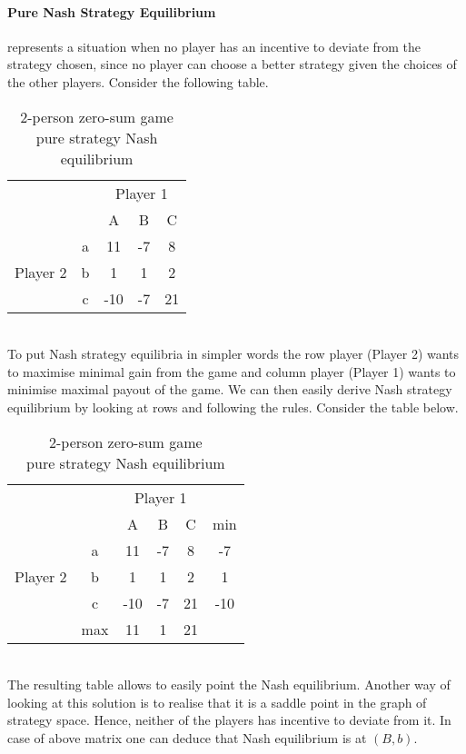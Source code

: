 \documentclass[10pt, a4paper]{report}
\begin{document}
\paragraph{Pure Nash Strategy Equilibrium} represents a situation when no player has an incentive to deviate from the strategy chosen, since no player can choose a better strategy given the choices of the other players. Consider the following table.
\begin{table}[ht!]
	\hspace{-4em}
	\centering
	\begin{tabular}{ccccc|}
		& & \multicolumn{3}{c}{Player 1}                                  \\ \cline{3-5}
		& & A & B & \multicolumn{1}{c}{C}                                 \\ \cline{3-5}
		\multirow{3}{*}{Player 2} & \multicolumn{1}{|c|}{a} & 11 & -7 & 8 \\
		& \multicolumn{1}{|c|}{b} & 1 & 1 & 2                             \\
		& \multicolumn{1}{|c|}{c} & -10 & -7 & 21                         \\ \cline{3-5}
	\end{tabular}
	\caption{2-person zero-sum game\\ pure strategy Nash equilibrium}
\end{table}
\\
To put Nash strategy equilibria in simpler words the row player (Player 2) wants to maximise minimal gain from the game and column player (Player 1) wants to minimise maximal payout of the game. We can then easily derive Nash strategy equilibrium by looking at rows and following the rules. Consider the table below.
\begin{table}[ht!]
	\hspace{-4em}
	\centering
	\begin{tabular}{ccccc|c}
		& & \multicolumn{3}{c}{Player 1} &                                     \\ \cline{3-5}
		& & A & B & \multicolumn{1}{c}{C} & min                                \\ \cline{3-5}
		\multirow{3}{*}{Player 2} & \multicolumn{1}{|c|}{a} & 11 & -7 & 8 & -7 \\
		& \multicolumn{1}{|c|}{b} & 1 & 1 & 2 & 1                              \\
		& \multicolumn{1}{|c|}{c} & -10 & -7 & 21 & -10                        \\ \cline{3-5}
		& max & 11 & 1 & \multicolumn{1}{c}{21} &
	\end{tabular}
	\caption{2-person zero-sum game\\ pure strategy Nash equilibrium}
\end{table}
\\
The resulting table allows to easily point the Nash equilibrium. Another way of looking at this solution is to realise that it is a saddle point in the graph of strategy space. Hence, neither of the players has incentive to deviate from it. In case of above matrix one can deduce that Nash equilibrium is at $(B,b)$.
\end{document}
